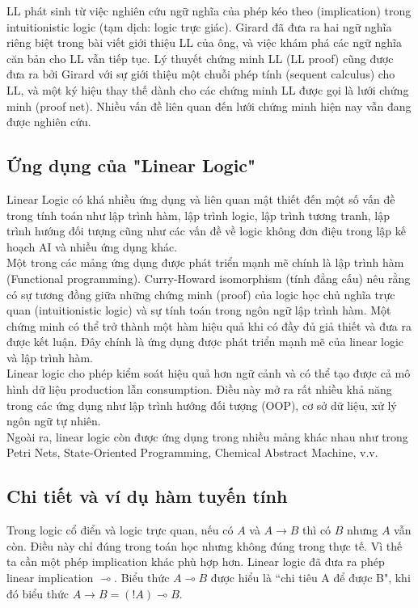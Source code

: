 \documentclass[a4paper]{article}
\begin{document}
LL phát sinh từ việc nghiên cứu ngữ nghĩa của phép kéo theo (implication) trong intuitionistic logic (tạm dịch: logic trực giác). Girard đã đưa ra hai ngữ nghĩa riêng biệt trong bài viết giới thiệu LL của ông, và việc khám phá các ngữ nghĩa căn bản cho LL vẫn tiếp tục. Lý thuyết chứng minh LL (LL proof) cũng được đưa ra bởi Girard với sự giới thiệu một chuỗi phép tính (sequent calculus) cho LL, và một ký hiệu thay thế dành cho các chứng minh LL được gọi là lưới chứng minh (proof net). Nhiều vấn đề liên quan đến lưới chứng minh hiện nay vẫn đang được nghiên cứu.

\subsection{Ứng dụng của "Linear Logic"}
Linear Logic có khá nhiều ứng dụng và liên quan mật thiết đến một số vấn đề trong tính toán như lập trình hàm, lập trình logic, lập trình tương tranh, lập trình hướng đối tượng cũng như các vấn đề về logic không đơn điệu trong lập kế hoạch AI và nhiều ứng dụng khác.\\

Một trong các mảng ứng dụng được phát triển mạnh mẽ chính là lập trình hàm (Functional programming). Curry-Howard isomorphism (tính đẳng cấu) nêu rằng có sự tương đồng giữa những chứng minh (proof) của logic học chủ nghĩa trực quan (intuitionistic logic) và sự tính toán trong ngôn ngữ lập trình hàm. Một chứng minh có thể trở thành một hàm hiệu quả khi có đầy đủ giả thiết và đưa ra được kết luận. Đây chính là ứng dụng được phát triển mạnh mẽ của linear logic và lập trình hàm.\\

Linear logic cho phép kiểm soát hiệu quả hơn ngữ cảnh và có thể tạo được cả mô hình dữ liệu production lẫn consumption. Điều này mở ra rất nhiều khả năng trong các ứng dụng như lập trình hướng đối tượng (OOP), cơ sở dữ liệu, xử lý ngôn ngữ tự nhiên.\\

Ngoài ra, linear logic còn được ứng dụng trong nhiều mảng khác nhau như trong Petri Nets, State-Oriented Programming, Chemical Abstract Machine, v.v.

\subsection{Chi tiết và ví dụ hàm tuyến tính}
Trong logic cổ điển và logic trực quan, nếu có $A$ và $A \rightarrow  B$ thì có $B$ nhưng $A$ vẫn còn. Điều này chỉ đúng trong toán học nhưng không đúng trong thực tế. Vì thế ta cần một phép implication khác phù hợp hơn. Linear logic đã đưa ra phép linear implication $\multimap$. Biểu thức $A \multimap B$ được hiểu là “chi tiêu A để được B", khi đó biểu thức $A \rightarrow B = (!A) \multimap B$.\\
\end{document}
